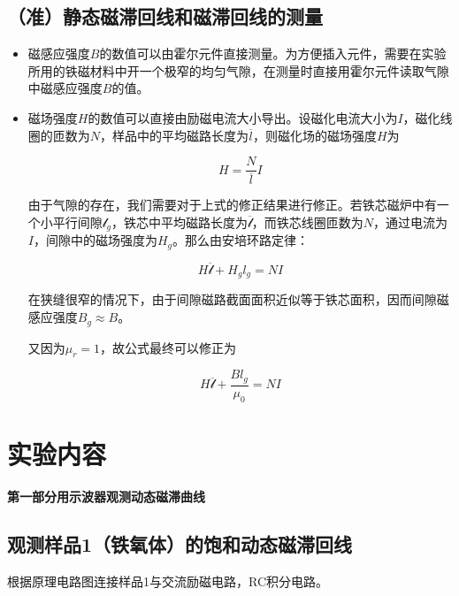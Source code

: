 \documentclass[12pt]{article}
\begin{document}
\subsection{（准）静态磁滞回线和磁滞回线的测量}

\begin{itemize}
    \item 磁感应强度$B$的数值可以由霍尔元件直接测量。为方便插入元件，需要在实验所用的铁磁材料中开一个极窄的均匀气隙，在测量时直接用霍尔元件读取气隙中磁感应强度$B$的值。
    \item 磁场强度$H$的数值可以直接由励磁电流大小导出。设磁化电流大小为$I$，磁化线圈的匝数为$N$，样品中的平均磁路长度为$\overline{l}$，则磁化场的磁场强度$H$为
    
    \[
        H=\frac{N}{\overline{l}}I
    \]

    由于气隙的存在，我们需要对于上式的修正结果进行修正。若铁芯磁炉中有一个小平行间隙$\mathscr{l}_g$，铁芯中平均磁路长度为$\overline{\mathscr{l}}$，而铁芯线圈匝数为$N$，通过电流为$I$，间隙中的磁场强度为$H_g$。那么由安培环路定律：

    \[
        H\overline{\mathscr{l}}+H_gl_g=NI
    \]

    在狭缝很窄的情况下，由于间隙磁路截面面积近似等于铁芯面积，因而间隙磁感应强度$B_g\approx B$。

    又因为$\mu_r=1$，故公式最终可以修正为

    \[
        H\overline{\mathscr{l}}+\frac{Bl_g}{\mu_0}=NI
    \]
\end{itemize}

\section{实验内容}

\begin{center}
    \large \textbf{第一部分}\quad\textbf{用示波器观测动态磁滞曲线}
\end{center}

\subsection{观测样品1（铁氧体）的饱和动态磁滞回线}
根据原理电路图连接样品1与交流励磁电路，RC积分电路。

\end{document}
